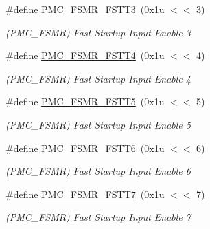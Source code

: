 \begin{DoxyCompactItemize}
\#define \mbox{\hyperlink{group__SAME70__PMC_ga209ebf830fe0d38dec72a4157c8c0285}{P\+M\+C\+\_\+\+F\+S\+M\+R\+\_\+\+F\+S\+T\+T3}}~(0x1u $<$$<$ 3)
\begin{DoxyCompactList}\small\item\em (P\+M\+C\+\_\+\+F\+S\+MR) Fast Startup Input Enable 3 \end{DoxyCompactList}\item 
\mbox{\label{group__SAME70__PMC_ga6ca1b1aa6cc30dfe611abc2f68c1225f}} 
\#define \mbox{\hyperlink{group__SAME70__PMC_ga6ca1b1aa6cc30dfe611abc2f68c1225f}{P\+M\+C\+\_\+\+F\+S\+M\+R\+\_\+\+F\+S\+T\+T4}}~(0x1u $<$$<$ 4)
\begin{DoxyCompactList}\small\item\em (P\+M\+C\+\_\+\+F\+S\+MR) Fast Startup Input Enable 4 \end{DoxyCompactList}\item 
\mbox{\label{group__SAME70__PMC_ga9bac35f07a6ff0faaf033f61b161f936}} 
\#define \mbox{\hyperlink{group__SAME70__PMC_ga9bac35f07a6ff0faaf033f61b161f936}{P\+M\+C\+\_\+\+F\+S\+M\+R\+\_\+\+F\+S\+T\+T5}}~(0x1u $<$$<$ 5)
\begin{DoxyCompactList}\small\item\em (P\+M\+C\+\_\+\+F\+S\+MR) Fast Startup Input Enable 5 \end{DoxyCompactList}\item 
\mbox{\label{group__SAME70__PMC_ga3b6da1895ec35cc9df97901ed644ecdb}} 
\#define \mbox{\hyperlink{group__SAME70__PMC_ga3b6da1895ec35cc9df97901ed644ecdb}{P\+M\+C\+\_\+\+F\+S\+M\+R\+\_\+\+F\+S\+T\+T6}}~(0x1u $<$$<$ 6)
\begin{DoxyCompactList}\small\item\em (P\+M\+C\+\_\+\+F\+S\+MR) Fast Startup Input Enable 6 \end{DoxyCompactList}\item 
\mbox{\label{group__SAME70__PMC_gaf4ff7e1da5eae4aac4516b218b6c82b3}} 
\#define \mbox{\hyperlink{group__SAME70__PMC_gaf4ff7e1da5eae4aac4516b218b6c82b3}{P\+M\+C\+\_\+\+F\+S\+M\+R\+\_\+\+F\+S\+T\+T7}}~(0x1u $<$$<$ 7)
\begin{DoxyCompactList}\small\item\em (P\+M\+C\+\_\+\+F\+S\+MR) Fast Startup Input Enable 7 \end{DoxyCompactList}\item 
$$
\end{DoxyCompactItemize}

